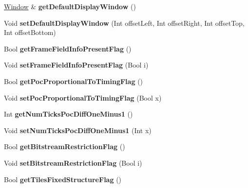 \begin{DoxyCompactItemize}
\mbox{\label{class_t_enc_cfg_aa9d26a94f887c0d5a1fdd3eaadb8583f}} 
\hyperlink{class_window}{Window} \& {\bfseries get\+Default\+Display\+Window} ()
\item 
\mbox{\label{class_t_enc_cfg_a6cbb16a362ccb8f28e3a00cbd61a689f}} 
Void {\bfseries set\+Default\+Display\+Window} (Int offset\+Left, Int offset\+Right, Int offset\+Top, Int offset\+Bottom)
\item 
\mbox{\label{class_t_enc_cfg_ac2e28f115717325c938faed679cb6b3e}} 
Bool {\bfseries get\+Frame\+Field\+Info\+Present\+Flag} ()
\item 
\mbox{\label{class_t_enc_cfg_abd2243c4e3982fdfa2a162e0eddd78dd}} 
Void {\bfseries set\+Frame\+Field\+Info\+Present\+Flag} (Bool i)
\item 
\mbox{\label{class_t_enc_cfg_a332d520aae853d1615d1351df9a0ed42}} 
Bool {\bfseries get\+Poc\+Proportional\+To\+Timing\+Flag} ()
\item 
\mbox{\label{class_t_enc_cfg_a4d979cd8d38ae4ef2a9b90a9cb0fc81b}} 
Void {\bfseries set\+Poc\+Proportional\+To\+Timing\+Flag} (Bool x)
\item 
\mbox{\label{class_t_enc_cfg_afbc72d707ce235ef06f75c127f448b00}} 
Int {\bfseries get\+Num\+Ticks\+Poc\+Diff\+One\+Minus1} ()
\item 
\mbox{\label{class_t_enc_cfg_a82a09fced6ea22e5de9288eef4a8e41c}} 
Void {\bfseries set\+Num\+Ticks\+Poc\+Diff\+One\+Minus1} (Int x)
\item 
\mbox{\label{class_t_enc_cfg_a3d800d350119926ac2a6a2ea966d2686}} 
Bool {\bfseries get\+Bitstream\+Restriction\+Flag} ()
\item 
\mbox{\label{class_t_enc_cfg_a4ede191270bde55552bb3899f9576247}} 
Void {\bfseries set\+Bitstream\+Restriction\+Flag} (Bool i)
\item 
\mbox{\label{class_t_enc_cfg_a1d6784f106f69822d1dd938351728564}} 
Bool {\bfseries get\+Tiles\+Fixed\+Structure\+Flag} ()

\end{DoxyCompactItemize}
